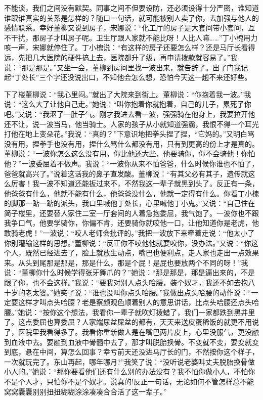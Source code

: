 \documentclass[12pt,oneside]{book}
\begin{document}
不能谈，我们之间没有默契。同事之间不但要设防，还必须设得十分严密，谁知道谁跟谁真实的关系是怎样的？随口一句话，就可能被别人卖了你，去加强与他人的感情联系。幸好董柳又说到房子，宋娜说：``化工厅的房子是大套间带小套间，互不干扰，那房子才叫房子呢。卫生厅跟人家就不能比呀！人比人嘛\ldots\ldots{}''丁小槐用力咳一声，宋娜就停住了。丁小槐说：``有这样的房子还要怎么样？还是马厅长看得远，先把几大医院的硬件搞上去，医院都升了级，再申请拨款就容易了。''我说：``那是那是。''又坐一会，董柳到房间里找一波出来，就告辞了。出了门我记起``丁处长''三个字还没说出口，不知他会怎么想，恐怕今天这一趟不来还好些。

下了楼董柳说：``我心里闷。''就出了大院来到街上。董柳说：``你抱着我一波。''我说：``这么大了让他自己走。''她说：``叫你抱着你就抱着，自己的儿子，累死了你吧。''又说：``我沤了一肚子气。刚才我进去看一波，强强骑在他身上，我要拉开他还不让，说一波当马，他当骑士。人家的孩子从小就知道强霸，我恨不得一个耳光打他在地上变朵花。''我说：``真的？''下意识地把拳头捏了捏，``它妈的。''又明白骂没有用，捏拳手也没有用，捏什么骂什么都没有用，只有到更高的份上才是真的。董柳说：``一波你怎么这么没有用，你比他还大些，他要骑你，你不会骑他！你怕他？''一波委屈着不做声。我说：``一波你从来不怕爸爸，什么时候你谁也不怕了，爸爸就高兴了。''说着这话我的鼻子直发酸。董柳说：``有其父必有其子，遗传就这么厉害！我一波不知道还能扳过来不，不然我这一辈子就黑到头了。反正有一条，他爸爸有什么，他就不能有什么，他爸爸没什么，他就一定得有什么。你看丁小槐的脚那一踮一踮的派头，我口里喊他丁处长，心里喊他丁小鬼。''又说：``自己住在简子楼里，还要替人家住二室一厅套间的人着急抱委屈，我气饱了。一波你也不跟我争口气，他要学骑你，你偏不肯，还要骑你就咬他一口，让他知道你是老虎，他敢骑老虎！''一波说：``咬人老师会批评的。''我把一波放下来牵着走说：``他太小了你别灌输这样的思想。''董柳说：``反正你不咬他他就要咬你，没办法。''又说：``你这个人，既然已经进去了，脸上就放生动点，嘴巴也便利点，走人家也走出一点效果来。从头到尾那是那是，那是什么，那是个屁！是屁也要放两个不同的呀！''我说：``董柳你什么时候学得张牙舞爪的？''她说：``那是那是，那是逼出来的，不是跟了你，也不会这样。''我说：``要我对别人点头哈腰，装个奴才，我还不如去抱八十岁的老太婆。''她笑了说：``谁也没叫你点头哈腰。''我做出点头哈腰的动作说：``一定要这样才叫点头哈腰？老是察颜观色顺着别人的意思讲话，比点头哈腰还点头哈腰。''她说：``按你这个想法，我看你一辈子就吹灯拨蜡了，我们一家都跌到黑井里了。这点委屈也算委屈？人家端尿盆屎盆的都有，天天来送皮蛋稀饭的就更不用说了，医院里我看得多了。我看你重新做人是在嘴巴两片皮上，心里没服气，更没融到血液中去。要融到血液中骨髓中去了，那才叫脱胎换骨。不变就不变，要变就变到底，悬在中间，算怎么回事？幸亏前天还没进马厅长的门，不然按你这个样子，一次就玩完了。东山再起，哪年哪月?''我笑了说：``没听说老婆叫丈夫脱胎换骨做小人的。''她说：``那你要看他们还有什么别的办法没有？我不怕你做小人，不怕你不是个人才，只怕你不是个奴才。说真的!反正一句话，无论如何不管怎样总不能窝窝囊囊别别扭扭糊糊涂涂凑凑合合活了这一辈子。''
\end{document}
